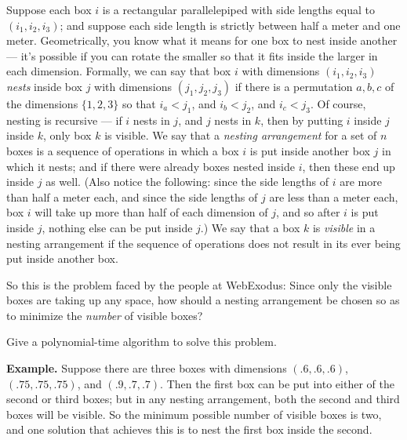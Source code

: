 \documentclass[12pt]{article}
\begin{document}
\begin{enumerate}
Suppose each box $i$ is a rectangular parallelepiped
with side lengths equal to $(i_1, i_2, i_3)$;
and suppose each side length is strictly between half a meter and one meter.
Geometrically, you know what it means for one box
to nest inside another --- it's possible if you can rotate the
smaller so that it fits inside the larger in each dimension.
Formally, we can say that box $i$ with dimensions $(i_1, i_2, i_3)$
{\em nests} inside box $j$ with dimensions $(j_1, j_2, j_3)$ if
there is a permutation $a, b, c$ of the dimensions $\{1, 2, 3\}$
so that $i_a < j_1$, and $i_b < j_2$, and $i_c < j_3$.
Of course, nesting is recursive --- if $i$ nests in $j$,
and $j$ nests in $k$, then by putting $i$ inside $j$ inside $k$,
only box $k$ is visible.
We say that a {\em nesting arrangement} for a set
of $n$ boxes is a sequence of operations in which
a box $i$ is put inside another box $j$ in which it nests;
and if there were already boxes nested inside $i$,
then these end up inside $j$ as well.
(Also notice the following:
since the side lengths of $i$ are more than half a meter each,
and since the side lengths of $j$ are less than a meter each,
box $i$ will take up more than half of each dimension of $j$,
and so after $i$ is put inside $j$, nothing else can be put inside $j$.)
We say that a box $k$ is {\em visible} in a nesting
arrangement if the sequence of operations does not
result in its ever being put inside another box.

So this is the problem faced by the people at WebExodus:
Since only the visible boxes are taking up any space,
how should a nesting arrangement be chosen
so as to minimize the {\em number} of visible boxes?

Give a polynomial-time algorithm to solve this problem.

\smallskip
{\bf Example.} Suppose there are three boxes with dimensions
$(.6, .6, .6)$, $(.75, .75, .75)$, and $(.9, .7, .7)$.
Then the first box can be put into either of the second
or third boxes;
but in any nesting arrangement, both the
second and third boxes will be visible.
So the minimum possible number of visible boxes is two,
and one solution that achieves this is to
nest the first box inside the second.

\end{enumerate}
\end{document}
